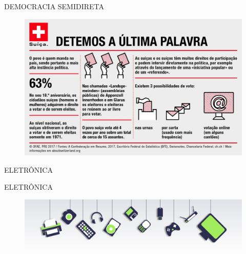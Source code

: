 \documentclass{Alexandre}
\begin{document}
\begin{frame}{DEMOCRACIA SEMIDIRETA}

    \begin{figure}
        \includegraphics[scale = 0.14]{Figuras/Suica.jpg}
    \end{figure}

\end{frame}


\begin{frame}{ELETRÔNICA}

\end{frame}


\begin{frame}{ELETRÔNICA}

    \begin{figure}
        \includegraphics[scale = 0.20]{Figuras/Eletronicos.png}
    \end{figure}

\end{frame}
\end{document}
